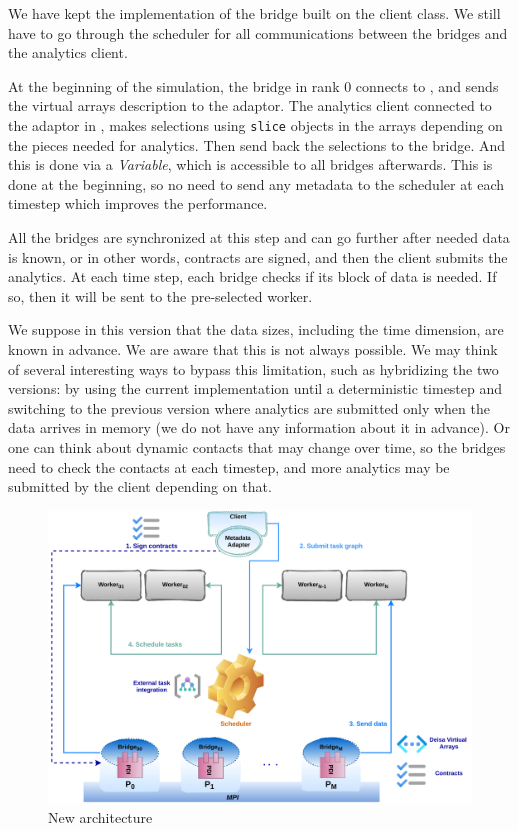 We have kept the implementation of the bridge built on the \dask client class. We still have to go through the scheduler for all communications between the bridges and the analytics client.    

At the beginning of the simulation, the bridge in rank $0$ connects to \dask, and sends the \deisa virtual arrays description to the adaptor. The analytics client connected to the adaptor in \dask, makes selections using \texttt{slice} objects in the \deisa arrays depending on the pieces needed for analytics. Then send back the selections to the bridge. And this is done via a \dask \textit{Variable}, which is accessible to all bridges afterwards. This is done at the beginning, so no need to send any metadata to the scheduler at each timestep which improves the performance. 

All the bridges are synchronized at this step and can go further after needed data is known, or in other words, contracts are signed, and then the client submits the analytics. 
At each time step, each bridge checks if its block of data is needed. If so, then it will be sent to the pre-selected worker. 

We suppose in this version that the data sizes, including the time dimension, are known in advance. We are aware that this is not always possible. We may think of several interesting ways to bypass this limitation, such as hybridizing the two versions: by using the current implementation until a deterministic timestep and switching to the previous version where analytics are submitted only when the data arrives in memory (we do not have any information about it in advance). Or one can think about dynamic contacts that may change over time, so the bridges need to check the contacts at each timestep, and more analytics may be submitted by the client depending on that.

\begin{figure}[tb]\centering
\includegraphics[width=\columnwidth]{figures/DeisaV2.pdf}
\caption{New \deisa architecture}
\label{figdeidav2}
\end{figure}

